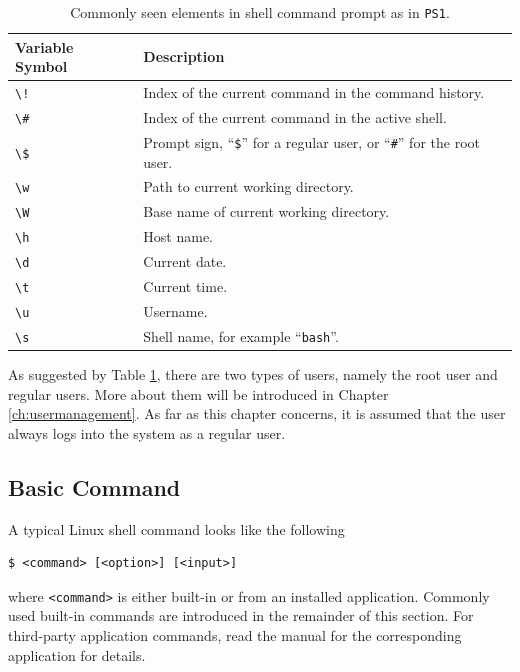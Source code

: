 \begin{table}[!htb]
	\centering \caption{Commonly seen elements in shell command prompt as in \texttt{PS1}.}\label{ch:sb:tab:promptvariable}
	\begin{tabularx}{\textwidth}{lX}
		\hline
		Variable Symbol & Description \\ \hline
		\verb|\!| & Index of the current command in the command history. \\ 
		\verb|\#| & Index of the current command in the active shell. \\ 
		\verb|\$| & Prompt sign, ``\verb|$|'' for a regular user, or ``\verb|#|'' for the root user. \\
		\verb|\w| & Path to current working directory. \\ 
		\verb|\W| & Base name of current working directory. \\ 
		\verb|\h| & Host name. \\ 
		\verb|\d| & Current date. \\ 
		\verb|\t| & Current time. \\ 
		\verb|\u| & Username. \\ 
		\verb|\s| & Shell name, for example ``\verb|bash|''. \\ 
		\hline
	\end{tabularx}
\end{table}

As suggested by Table \ref{ch:sb:tab:promptvariable}, there are two types of users, namely the root user and regular users. More about them will be introduced in Chapter \ref{ch:usermanagement}. As far as this chapter concerns, it is assumed that the user always logs into the system as a regular user.

\subsection{Basic Command}

A typical Linux shell command looks like the following
\begin{lstlisting}
$ <command> [<option>] [<input>]
\end{lstlisting}
where \verb|<command>| is either built-in or from an installed application. Commonly used built-in commands are introduced in the remainder of this section. For third-party application commands, read the manual for the corresponding application for details.

